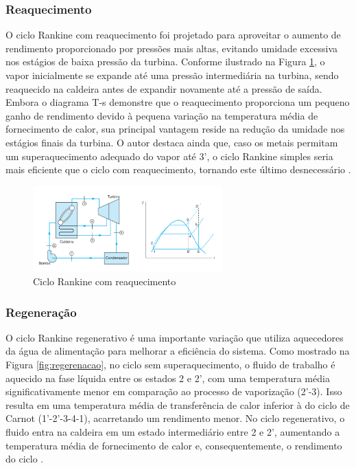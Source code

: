 \documentclass[
	article,			%
	11pt,				%
	oneside,			%
	a4paper,			%
	english,			%
	brazil,				%
	sumario=tradicional
	]{abntex2}
\begin{document}
\subsubsection{Reaquecimento}

O ciclo Rankine com reaquecimento foi projetado para aproveitar o aumento de rendimento proporcionado por pressões mais altas, evitando umidade excessiva nos estágios de baixa pressão da turbina. Conforme ilustrado na Figura \ref{fig:reaquecimento}, o vapor inicialmente se expande até uma pressão intermediária na turbina, sendo reaquecido na caldeira antes de expandir novamente até a pressão de saída. Embora o diagrama T-s demonstre que o reaquecimento proporciona um pequeno ganho de rendimento devido à pequena variação na temperatura média de fornecimento de calor, sua principal vantagem reside na redução da umidade nos estágios finais da turbina. O autor destaca ainda que, caso os metais permitam um superaquecimento adequado do vapor até 3', o ciclo Rankine simples seria mais eficiente que o ciclo com reaquecimento, tornando este último desnecessário \cite{borgnakke-2020}.

\begin{figure}[h]
	\centering
	\includegraphics[width=0.65\textwidth]{./images/reaquecimento.png}
	\caption{Ciclo Rankine com reaquecimento}
	\label{fig:reaquecimento}
\end{figure}

\subsubsection{Regeneração}

O ciclo Rankine regenerativo é uma importante variação que utiliza aquecedores da água de alimentação para melhorar a eficiência do sistema. Como mostrado na Figura \ref{fig:regerenacao}, no ciclo sem superaquecimento, o fluido de trabalho é aquecido na fase líquida entre os estados 2 e 2', com uma temperatura média significativamente menor em comparação ao processo de vaporização (2'-3). Isso resulta em uma temperatura média de transferência de calor inferior à do ciclo de Carnot (1'-2'-3-4-1), acarretando um rendimento menor. No ciclo regenerativo, o fluido entra na caldeira em um estado intermediário entre 2 e 2', aumentando a temperatura média de fornecimento de calor e, consequentemente, o rendimento do ciclo \cite{borgnakke-2020}.
\end{document}
